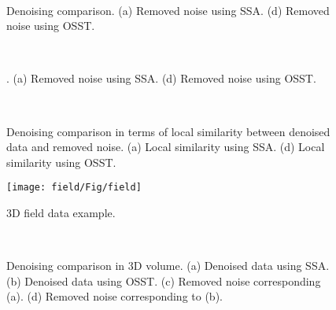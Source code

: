 \begin{figure}[htb!]
  \centering
  \\
   \caption{Denoising comparison. (a) Removed noise using SSA. (d) Removed noise using OSST. }
   \label{fig:real-n}
\end{figure}

\begin{figure}[htb!]
  \centering
  \\
   \caption{. (a) Removed noise using SSA. (d) Removed noise using OSST.}
   \label{fig:real-n-z}
\end{figure}

\begin{figure}[htb!]
  \centering
  \\
   \caption{Denoising comparison in terms of local similarity between denoised data and removed noise. (a) Local similarity using SSA. (d) Local similarity using OSST.}
   \label{fig:real-simi}
\end{figure}

\begin{figure}[htb!]
  \centering
  \texttt{[image: field/Fig/field]}          
   \caption{3D field data example.}
   \label{fig:field}
\end{figure}

\begin{figure}[htb!]
  \centering
   \\
   \caption{Denoising comparison in 3D volume. (a) Denoised data using SSA. (b) Denoised data using OSST. (c) Removed noise corresponding (a). (d) Removed noise corresponding to (b).}
   \label{fig:field-3d}
\end{figure}


